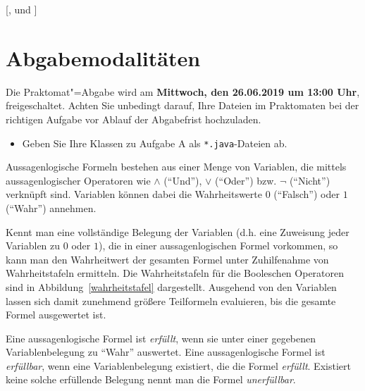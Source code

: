 \documentclass{sdqassignment}
\begin{document}
[,  und ]

\section*{Abgabemodalitäten}
Die Praktomat"=Abgabe wird am \textbf{Mittwoch, den 26.06.2019 um 13:00 Uhr}, freigeschaltet. Achten Sie unbedingt darauf, Ihre Dateien im Praktomaten bei der richtigen Aufgabe vor Ablauf der Abgabefrist hochzuladen.
\begin{itemize}
    \item Geben Sie Ihre Klassen zu Aufgabe A als \texttt{*.java}-Dateien ab.
\end{itemize}

\terminalinfo

\newpage

Aussagenlogische Formeln bestehen aus einer Menge von Variablen, die mittels aussagenlogischer Operatoren wie $\land$ (\enquote{Und}), $\lor$ (\enquote{Oder}) bzw. $\lnot$ (\enquote{Nicht}) verknüpft sind. Variablen können dabei die Wahrheitswerte $0$ (\enquote{Falsch}) oder $1$ (\enquote{Wahr}) annehmen.

Kennt man eine vollständige Belegung der Variablen (d.h. eine Zuweisung jeder Variablen zu $0$ oder $1$), die in einer aussagenlogischen Formel vorkommen, so kann man den Wahrheitwert der gesamten Formel unter Zuhilfenahme von Wahrheitstafeln ermitteln. Die Wahrheitstafeln für die Booleschen Operatoren sind in Abbildung~\ref{wahrheitstafel} dargestellt. Ausgehend von den Variablen lassen sich damit zunehmend größere Teilformeln evaluieren, bis die gesamte Formel ausgewertet ist.

Eine aussagenlogische Formel ist \textit{erfüllt}, wenn sie unter einer gegebenen Variablenbelegung zu \enquote{Wahr} auswertet. Eine aussagenlogische Formel ist \textit{erfüllbar}, wenn eine Variablenbelegung existiert, die die Formel \textit{erfüllt}. Existiert keine solche erfüllende Belegung nennt man die Formel \textit{unerfüllbar}.
\end{document}
